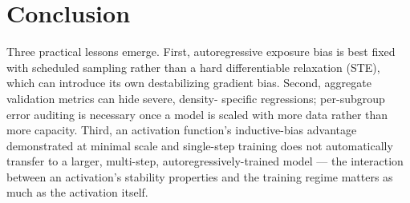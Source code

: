 \documentclass{article}
\begin{document}
\section{Conclusion}

Three practical lessons emerge. First, autoregressive exposure bias is
best fixed with scheduled sampling rather than a hard differentiable
relaxation (STE), which can introduce its own destabilizing gradient
bias. Second, aggregate validation metrics can hide severe, density-
specific regressions; per-subgroup error auditing is necessary once a
model is scaled with more data rather than more capacity. Third, an
activation function's inductive-bias advantage demonstrated at minimal
scale and single-step training does not automatically transfer to a
larger, multi-step, autoregressively-trained model --- the interaction
between an activation's stability properties and the training regime
matters as much as the activation itself.



\end{document}
